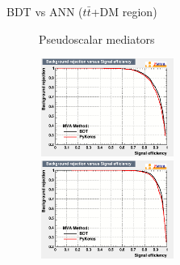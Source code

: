 \documentclass[8pt]{beamer}
\begin{document}
\begin{frame}{BDT vs ANN ($t \bar t$+DM region)}
\begin{figure}[htbp]
\begin{block}{ \centering Pseudoscalar mediators}\end{block}
\begin{minipage}[b]{.49\textwidth}
\begin{center}
\includegraphics[width=4.5cm, height=3.2cm]{figs/ROC_pseudo100_TTbar.png}
\end{center}
\end{minipage} \hfill
\begin{minipage}[b]{.49\textwidth}
\begin{center}
\includegraphics[width=4.5cm, height=3.2cm]{figs/ROC_pseudo500_TTbar.png}
\end{center}
\end{minipage} \hfill

\label{fig:ROC_TTbar}
\end{figure}
\end{frame}
\end{document}
